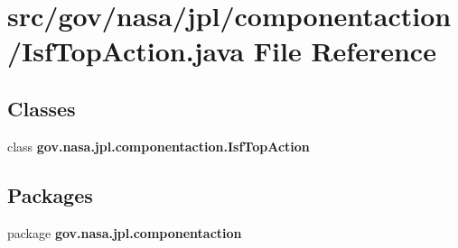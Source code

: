 \section{src/gov/nasa/jpl/componentaction/\+Isf\+Top\+Action.java File Reference}
\label{_isf_top_action_8java}
\subsection*{Classes}
\begin{DoxyCompactItemize}
\item 
class {\bf gov.\+nasa.\+jpl.\+componentaction.\+Isf\+Top\+Action}
\end{DoxyCompactItemize}
\subsection*{Packages}
\begin{DoxyCompactItemize}
\item 
package {\bf gov.\+nasa.\+jpl.\+componentaction}
\end{DoxyCompactItemize}
